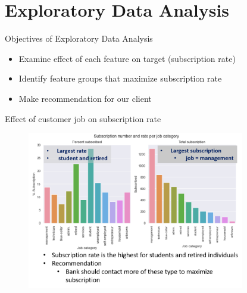 \section{Exploratory Data Analysis} %

\begin{frame}{Objectives of Exploratory Data Analysis}
\begin{itemize}
    \item Examine effect of each feature on target (subscription rate)
    \item Identify feature groups that maximize subscription rate
    \item Make recommendation for our client
\end{itemize}

\end{frame}


\begin{frame}{Effect of customer job on subscription rate}


	\begin{figure}
		
		\includegraphics[width=9.50cm]{figures/fig_job_rate.png}
	\end{figure}


\end{frame}


